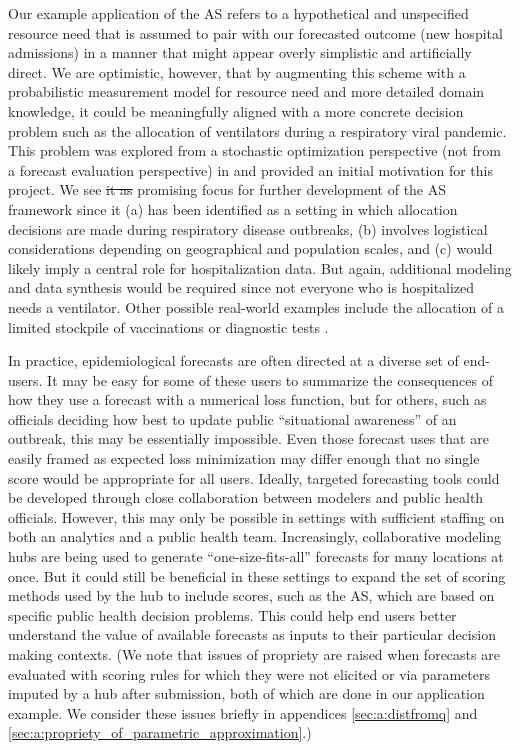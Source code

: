 \documentclass{article}\usepackage[]{graphicx}\usepackage[]{xcolor}
\providecommand{\DIFaddtex}[1]{{\protect\color{blue}\uwave{#1}}} %
\providecommand{\DIFdeltex}[1]{{\protect\color{red}\sout{#1}}}                      %
\providecommand{\DIFaddbegin}{} %
\providecommand{\DIFaddend}{} %
\providecommand{\DIFdelbegin}{} %
\providecommand{\DIFdelend}{} %
\providecommand{\DIFadd}[1]{\texorpdfstring{\DIFaddtex{#1}}{#1}} %
\providecommand{\DIFdel}[1]{\texorpdfstring{\DIFdeltex{#1}}{}} %
\newcommand{\DIFscaledelfig}{0.5}
\newlength{\DIFdelgraphicswidth} %
\newlength{\DIFdelgraphicsheight} %
\newcommand{\DIFaddincludegraphics}[2][]{{\color{blue}\fbox{\DIFOincludegraphics[#1]{#2}}}} %
\newcommand{\DIFdelincludegraphics}[2][]{%
\sbox{\DIFdelgraphicsbox}{\DIFOincludegraphics[#1]{#2}}%
\settoboxwidth{\DIFdelgraphicswidth}{\DIFdelgraphicsbox} %
\settoboxtotalheight{\DIFdelgraphicsheight}{\DIFdelgraphicsbox} %
\scalebox{\DIFscaledelfig}{%
\parbox[b]{\DIFdelgraphicswidth}{\usebox{\DIFdelgraphicsbox}\\[-\baselineskip] \rule{\DIFdelgraphicswidth}{0em}}\llap{\resizebox{\DIFdelgraphicswidth}{\DIFdelgraphicsheight}{%
\setlength{\unitlength}{\DIFdelgraphicswidth}%
\begin{picture}(1,1)%
\thicklines\linethickness{2pt} %
{\color[rgb]{1,0,0}\put(0,0){\framebox(1,1){}}}%
{\color[rgb]{1,0,0}\put(0,0){\line( 1,1){1}}}%
{\color[rgb]{1,0,0}\put(0,1){\line(1,-1){1}}}%
\end{picture}%
}\hspace*{3pt}}} %
} %
\DeclareRobustCommand{\DIFaddbegin}{\DIFOaddbegin \let\includegraphics\DIFaddincludegraphics} %
\DeclareRobustCommand{\DIFaddend}{\DIFOaddend \let\includegraphics\DIFOincludegraphics} %
\DeclareRobustCommand{\DIFdelbegin}{\DIFOdelbegin \let\includegraphics\DIFdelincludegraphics} %
\DeclareRobustCommand{\DIFdelend}{\DIFOaddend \let\includegraphics\DIFOincludegraphics} %
\begin{document}
Our example application of the AS refers to a hypothetical and unspecified resource need that is assumed to pair with
our forecasted outcome (new hospital admissions) in a manner that might appear overly simplistic and artificially
direct.  We are optimistic, however, that by augmenting this scheme with a probabilistic measurement model for resource
need and more detailed domain knowledge, it could be meaningfully aligned with a more concrete decision problem such as
the allocation of ventilators during a respiratory viral pandemic.  This problem was explored from a stochastic
optimization perspective (not from a forecast evaluation perspective) in \cite{huang_stockpiling_2017} and provided an
initial motivation for this project. We see \DIFdelbegin \DIFdel{it as }\DIFdelend \DIFaddbegin \DIFadd{this as a }\DIFaddend promising focus for further development of the AS framework since it
(a) has been identified as a setting in which allocation decisions are made during respiratory disease outbreaks, (b) involves
logistical considerations depending on geographical and population scales, and (c) would likely imply a central role for
hospitalization data. But again, additional modeling and data synthesis would be required since not everyone who is
hospitalized needs a ventilator. Other possible real-world examples include the allocation of a limited stockpile of
vaccinations \citep{araz_geographic_2012,persad_fair_2023} or diagnostic tests
\citep{du_optimal_2022,pasco_covid-19_2023}.

In practice, epidemiological forecasts are often directed at a diverse set of end-users. It may be easy for some of
these users to summarize the consequences of how they use a forecast with a numerical loss function, but for others,
such as officials deciding how best to update public ``situational awareness'' of an outbreak, this may be essentially
impossible. Even those forecast uses that are easily framed as expected loss minimization may differ enough that no
single score would be appropriate for all users. Ideally, targeted forecasting tools could be developed through close
collaboration between modelers and public health officials. However, this may only be possible in settings with
sufficient staffing on both an analytics and a public health team. Increasingly, collaborative modeling hubs are being
used to generate ``one-size-fits-all'' forecasts for many locations at once. But it could still be beneficial in these
settings to expand the set of scoring methods used by the hub to include scores, such as the AS, which are based on
specific public health decision problems.  This could help end users better understand the value of available forecasts
as inputs to their particular decision making contexts. (We note that issues of propriety are raised when forecasts are
evaluated with scoring rules for which they were not elicited or via parameters imputed by a hub after submission, both
of which are done in our application example.  We consider these issues briefly in appendices
\ref{sec:a:distfromq} and \ref{sec:a:propriety_of_parametric_approximation}.)
\end{document}
